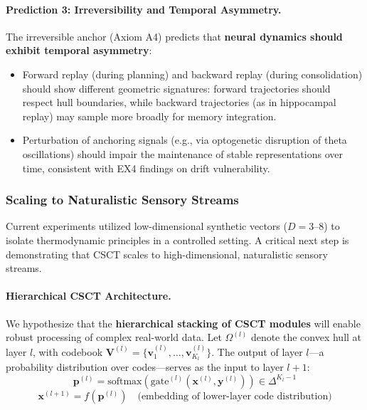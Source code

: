 \documentclass{article}
\begin{document}
\paragraph{Prediction 3: Irreversibility and Temporal Asymmetry.}
The irreversible anchor (Axiom A4) predicts that \textbf{neural dynamics should exhibit temporal asymmetry}:
\begin{itemize}
    \item Forward replay (during planning) and backward replay (during consolidation) should show different geometric signatures: forward trajectories should respect hull boundaries, while backward trajectories (as in hippocampal replay) may sample more broadly for memory integration.
    \item Perturbation of anchoring signals (e.g., via optogenetic disruption of theta oscillations) should impair the maintenance of stable representations over time, consistent with EX4 findings on drift vulnerability.
\end{itemize}

\subsubsection{Scaling to Naturalistic Sensory Streams}

Current experiments utilized low-dimensional synthetic vectors ($D = 3$--$8$) to isolate thermodynamic principles in a controlled setting.
A critical next step is demonstrating that CSCT scales to high-dimensional, naturalistic sensory streams.

\paragraph{Hierarchical CSCT Architecture.}
We hypothesize that the \textbf{hierarchical stacking of CSCT modules} will enable robust processing of complex real-world data.
Let $\Omega^{(l)}$ denote the convex hull at layer $l$, with codebook $\mathbf{V}^{(l)} = \{\mathbf{v}_1^{(l)}, \ldots, \mathbf{v}_{K_l}^{(l)}\}$.
The output of layer $l$---a probability distribution over codes---serves as the input to layer $l+1$:
\begin{equation}
    \mathbf{p}^{(l)} = \text{softmax}(\text{gate}^{(l)}(\mathbf{x}^{(l)}, \mathbf{y}^{(l)})) \in \Delta^{K_l - 1}
\end{equation}
\begin{equation}
    \mathbf{x}^{(l+1)} = f(\mathbf{p}^{(l)}) \quad \text{(embedding of lower-layer code distribution)}
\end{equation}
\end{document}
